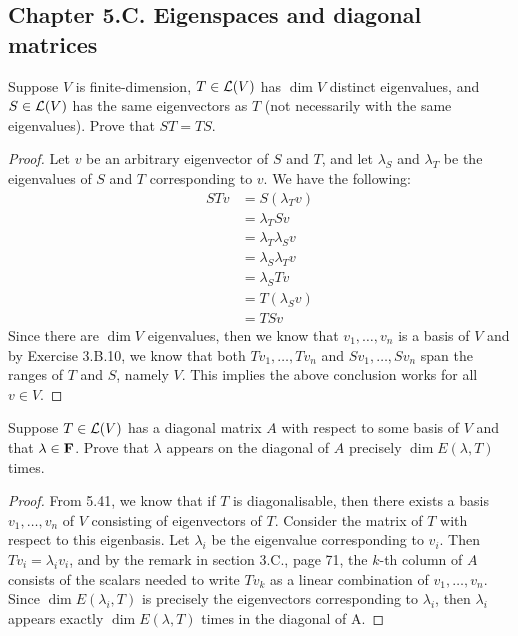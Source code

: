 \subsection*{Chapter 5.C. Eigenspaces and diagonal matrices}


\begin{exercise}{6}
  Suppose $V$ is finite-dimension, $T\in\mathcal{L}(V)$ has $\dim V$ distinct eigenvalues, and $S\in\mathcal{L}(V)$ has the same eigenvectors as $T$ (not necessarily with the same eigenvalues). Prove that $ST=TS$.
\end{exercise}
\begin{proof}
 Let $v$ be an arbitrary eigenvector of $S$ and $T$, and let $\lambda_S$ and $\lambda_T$ be the eigenvalues of $S$ and $T$ corresponding to $v$. We have the following:
 \begin{align*}
     STv &= S(\lambda_T v)\\
     &= \lambda_T Sv\\
     &= \lambda_T\lambda_S v\\
     &= \lambda_S\lambda_T v\\
     &= \lambda_S Tv\\
     &= T(\lambda_S v)\\
     &= TSv
 \end{align*}
 Since there are $\dim V$ eigenvalues, then we know that $v_1,\dots,v_n$ is a basis of $V$ and by Exercise 3.B.10, we know that both $Tv_1,\dots,Tv_n$ and $Sv_1,\dots,Sv_n$ span the ranges of $T$ and $S$, namely $V$. This implies the above conclusion works for all $v\in V$.
\end{proof}

\begin{exercise}{7}
  Suppose $T\in\mathcal{L}(V)$ has a diagonal matrix $A$ with respect to some basis of $V$ and that $\lambda\in\mathbf{F}$. Prove that $\lambda$ appears on the diagonal of $A$ precisely $\dim E(\lambda, T)$ times.
\end{exercise}
\begin{proof}
 From 5.41, we know that if $T$ is diagonalisable, then there exists a basis $v_1,\dots,v_n$ of $V$ consisting of eigenvectors of $T$. Consider the matrix of $T$ with respect to this eigenbasis. Let $\lambda_i$ be the eigenvalue corresponding to $v_i$. Then $Tv_i=\lambda_iv_i$, and by the remark in section 3.C., page 71, the $k$-th column of $A$ consists of the scalars needed to write $Tv_k$ as a linear combination of $v_1,\dots,v_n$. Since $\dim E(\lambda_i,T)$ is precisely the eigenvectors corresponding to $\lambda_i$, then $\lambda_i$ appears exactly $\dim E(\lambda, T)$ times in the diagonal of A.
\end{proof}

